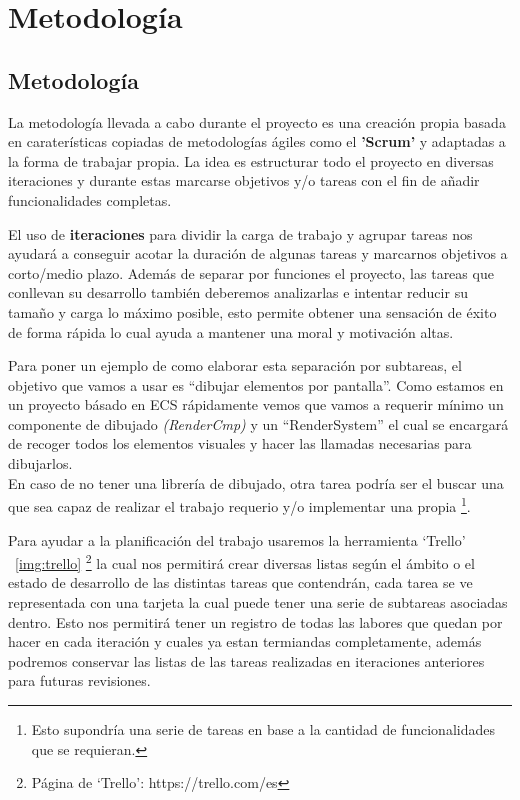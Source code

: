 \chapter{Metodología}
\label{metodologia}

\section{Metodología}
La metodología llevada a cabo durante el proyecto es una creación propia basada en caraterísticas
copiadas de metodologías ágiles como el \textbf{'Scrum'} y adaptadas a la forma de trabajar propia.
La idea es estructurar todo el proyecto en diversas iteraciones y durante estas marcarse
objetivos y/o tareas con el fin de añadir funcionalidades completas.

El uso de \textbf{iteraciones} para dividir la carga de trabajo y agrupar tareas nos ayudará
a conseguir acotar la duración de algunas tareas y marcarnos objetivos a corto/medio
plazo. Además de separar por funciones el proyecto, las tareas que conllevan su desarrollo
también deberemos analizarlas e intentar reducir su tamaño y carga lo máximo posible, esto
permite obtener una sensación de éxito de forma rápida lo cual ayuda a mantener una moral y 
motivación altas.

Para poner un ejemplo de como elaborar esta separación por subtareas, el objetivo que vamos a
usar es ``dibujar elementos por pantalla''. Como estamos en un proyecto básado en \ac{ECS} rápidamente
vemos que vamos a requerir mínimo un componente de dibujado \textit{(RenderCmp)} y un 
``RenderSystem'' el cual se encargará de recoger todos los elementos visuales y hacer las
llamadas necesarias para dibujarlos. \\
En caso de no tener una librería de dibujado, otra tarea podría ser el buscar una que sea capaz
de realizar el trabajo requerio y/o implementar una propia
\footnote{Esto supondría una serie de tareas en base a la cantidad de funcionalidades que se requieran.}. 

Para ayudar a la planificación del trabajo usaremos la herramienta `Trello'
~\ref{img:trello} \footnote{Página de `Trello': https://trello.com/es}
la cual nos permitirá crear diversas listas según el ámbito o el estado de
desarrollo de las distintas tareas que contendrán, cada tarea se ve representada con
una tarjeta la cual puede tener una serie de subtareas asociadas dentro. Esto nos
permitirá tener un registro de todas las labores que quedan por hacer en cada iteración y
cuales ya estan termiandas completamente, además podremos conservar las listas de las tareas
realizadas en iteraciones anteriores para futuras revisiones.

